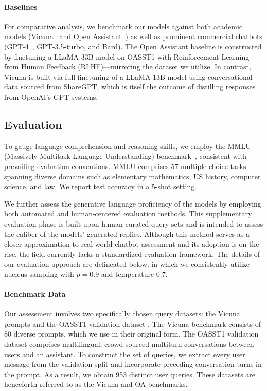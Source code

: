 \paragraph{Baselines} For comparative analysis, we benchmark our models against both academic models (Vicuna~\citep{vicuna2023} and Open Assistant~\citep{kopf2023openassistant}) as well as prominent commercial chatbots (GPT-4~\citep{openai2023gpt}, GPT-3.5-turbo, and Bard). The Open Assistant baseline is constructed by finetuning a LLaMA 33B model on OASST1 with Reinforcement Learning from Human Feedback (RLHF)—mirroring the dataset we utilize. In contrast, Vicuna is built via full finetuning of a LLaMA 13B model using conversational data sourced from ShareGPT, which is itself the outcome of distilling responses from OpenAI’s GPT systems.

\subsection{Evaluation}

To gauge language comprehension and reasoning skills, we employ the MMLU (Massively Multitask Language Understanding) benchmark~\citep{hendrycksmeasuring}, consistent with prevailing evaluation conventions. MMLU comprises 57 multiple-choice tasks spanning diverse domains such as elementary mathematics, US history, computer science, and law. We report test accuracy in a 5-shot setting.

We further assess the generative language proficiency of the models by employing both automated and human-centered evaluation methods. This supplementary evaluation phase is built upon human-curated query sets and is intended to assess the caliber of the models’ generated replies. Although this method serves as a closer approximation to real-world chatbot assessment and its adoption is on the rise, the field currently lacks a standardized evaluation framework. The details of our evaluation approach are delineated below, in which we consistently utilize nucleus sampling with $p=0.9$ and temperature $0.7$.

\paragraph{Benchmark Data} Our assessment involves two specifically chosen query datasets: the Vicuna prompts \citep{vicuna2023} and the OASST1 validation dataset \citep{kopf2023openassistant}. The Vicuna benchmark consists of 80 diverse prompts, which we use in their original form. The OASST1 validation dataset comprises multilingual, crowd-sourced multiturn conversations between users and an assistant. To construct the set of queries, we extract every user message from the validation split and incorporate preceding conversation turns in the prompt. As a result, we obtain 953 distinct user queries. These datasets are henceforth referred to as the Vicuna and OA benchmarks.

